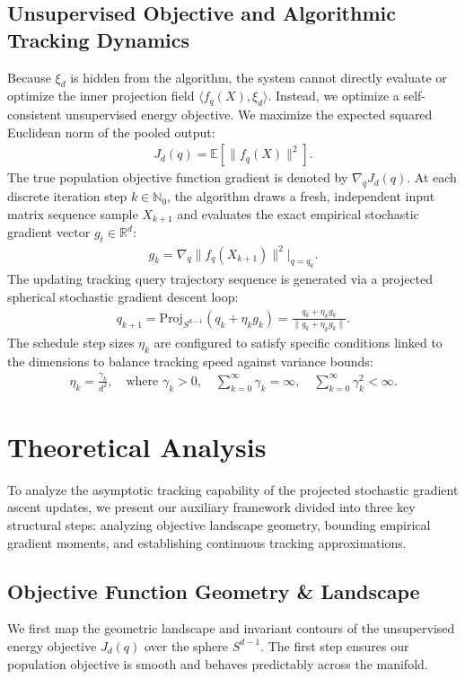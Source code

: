 \documentclass[11pt,a4paper]{article}
\theoremstyle{definition}
\begin{document}
\subsection{Unsupervised Objective and Algorithmic Tracking Dynamics}
Because $\xi_d$ is hidden from the algorithm, the system cannot directly evaluate or optimize the inner projection field $\langle f_q(X), \xi_d \rangle$. Instead, we optimize a self-consistent unsupervised energy objective. We maximize the expected squared Euclidean norm of the pooled output:
\begin{align}
J_{d}(q) = \mathbb{E}\left[ \|f_{q}(X)\|^2 \right].
\end{align}
The true population objective function gradient is denoted by $\nabla_q J_d(q)$. At each discrete iteration step $k \in \mathbb{N}_0$, the algorithm draws a fresh, independent input matrix sequence sample $X_{k+1}$ and evaluates the exact empirical stochastic gradient vector $g_t \in \mathbb{R}^d$:
\begin{align}
g_k = \nabla_{q} \|f_{q}(X_{k+1})\|^2 \Big|_{q = q_k}.
\end{align}
The updating tracking query trajectory sequence is generated via a projected spherical stochastic gradient descent loop:
\begin{align}
q_{k+1} = \text{Proj}_{S^{d-1}}(q_k + \eta_k g_k) = \frac{q_k + \eta_k g_k}{\|q_k + \eta_k g_k\|}.
\end{align}
The schedule step sizes $\eta_k$ are configured to satisfy specific conditions linked to the dimensions to balance tracking speed against variance bounds:
\begin{align}
\eta_k = \frac{\gamma_k}{d^2}, \quad \text{where } \gamma_k > 0, \quad \sum_{k=0}^{\infty} \gamma_k = \infty, \quad \sum_{k=0}^{\infty} \gamma_k^{2} < \infty.
\end{align}
\section{Theoretical Analysis}

To analyze the asymptotic tracking capability of the projected stochastic gradient ascent updates, we present our auxiliary framework divided into three key structural steps: analyzing objective landscape geometry, bounding empirical gradient moments, and establishing continuous tracking approximations.

\subsection{Objective Function Geometry \& Landscape}
We first map the geometric landscape and invariant contours of the unsupervised energy objective $J_d(q)$ over the sphere $S^{d-1}$. The first step ensures our population objective is smooth and behaves predictably across the manifold.
\end{document}
